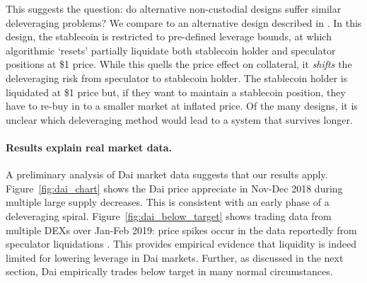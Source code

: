 This suggests the question: do alternative non-custodial designs suffer similar deleveraging problems? We compare to an alternative design described in \cite{cao2018}. In this design, the stablecoin is restricted to pre-defined leverage bounds, at which algorithmic `resets' partially liquidate both stablecoin holder and speculator positions at \$1 price. While this quells the price effect on collateral, it \emph{shifts} the deleveraging risk from speculator to stablecoin holder. The stablecoin holder is liquidated at \$1 price but, if they want to maintain a stablecoin position, they have to re-buy in to a smaller market at inflated price. Of the many designs, it is unclear which deleveraging method would lead to a system that survives longer.



\paragraph{Results explain real market data.}
A preliminary analysis of Dai market data suggests that our results apply. Figure~\ref{fig:dai_chart} shows the Dai price appreciate in Nov-Dec 2018 during multiple large supply decreases. This is consistent with an early phase of a deleveraging spiral. Figure~\ref{fig:dai_below_target} shows trading data from multiple DEXs over Jan-Feb 2019: price spikes occur in the data reportedly from speculator liquidations \cite{rowe_tweet2019}. This provides empirical evidence that liquidity is indeed limited for lowering leverage in Dai markets. Further, as discussed in the next section, Dai empirically trades below target in many normal circumstances.

